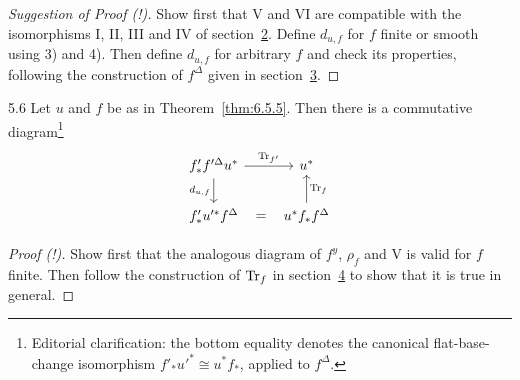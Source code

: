 \begin{proof}[Suggestion of Proof (!)]
Show first that V and VI are compatible with the isomorphisms I, II, III and IV of section~\hyperref[sec:6.2]{2}. Define $d_{u,f}$ for $f$ finite or smooth using 3) and 4). Then define $d_{u,f}$ for arbitrary $f$ and check its properties, following the construction of $f^{\Delta}$ given in section~\hyperref[sec:6.3]{3}.
\end{proof}

\begin{booktheorem}{5.6}\label{thm:6.5.6}
Let $u$ and $f$ be as in Theorem~\ref{thm:6.5.5}. Then there is a commutative diagram\footnote{Editorial clarification: the bottom equality denotes the canonical flat-base-change isomorphism $f'_*u'^*\cong u^*f_*$, applied to $f^\Delta$.}
\[
\begin{tikzcd}
f'_* f'^{\Delta} u^{*} \ar[r,"\Tr_{f'}"] \ar[d,"d_{u,f}"'] & u^{*} \\
f'_* u'^{*} f^{\Delta} \ar[r,phantom,"="] & u^{*} f_* f^{\Delta} \ar[u,"\Tr_f"']
\end{tikzcd}
\]
\end{booktheorem}

\begin{proof}[Proof (!)]
Show first that the analogous diagram of $f^{y}$, $\rho_f$ and V is valid for $f$ finite. Then follow the construction of $\operatorname{Tr}_f$ in section~\hyperref[sec:6.4]{4} to show that it is true in general.
\end{proof}\par\endgroup
